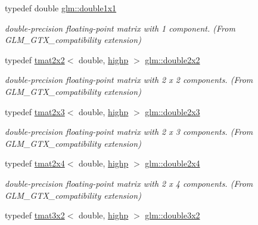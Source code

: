 \begin{DoxyCompactItemize}
typedef double \mbox{\hyperlink{group__gtx__compatibility_ga1c87d3042377335eb050a20ab0ec148a}{glm\+::double1x1}}
\begin{DoxyCompactList}\small\item\em double-\/precision floating-\/point matrix with 1 component. (From G\+L\+M\+\_\+\+G\+T\+X\+\_\+compatibility extension) \end{DoxyCompactList}\item 
typedef \mbox{\hyperlink{structglm_1_1tmat2x2}{tmat2x2}}$<$ double, \mbox{\hyperlink{namespaceglm_a0f04f086094c747d227af4425893f545ac6f7eab42eacbb10d59a58e95e362074}{highp}} $>$ \mbox{\hyperlink{group__gtx__compatibility_ga7651d80f2dcc222a2e229ce44af96f11}{glm\+::double2x2}}
\begin{DoxyCompactList}\small\item\em double-\/precision floating-\/point matrix with 2 x 2 components. (From G\+L\+M\+\_\+\+G\+T\+X\+\_\+compatibility extension) \end{DoxyCompactList}\item 
typedef \mbox{\hyperlink{structglm_1_1tmat2x3}{tmat2x3}}$<$ double, \mbox{\hyperlink{namespaceglm_a0f04f086094c747d227af4425893f545ac6f7eab42eacbb10d59a58e95e362074}{highp}} $>$ \mbox{\hyperlink{group__gtx__compatibility_ga60ae0f5858d498b2e5b9bb8d23019db0}{glm\+::double2x3}}
\begin{DoxyCompactList}\small\item\em double-\/precision floating-\/point matrix with 2 x 3 components. (From G\+L\+M\+\_\+\+G\+T\+X\+\_\+compatibility extension) \end{DoxyCompactList}\item 
typedef \mbox{\hyperlink{structglm_1_1tmat2x4}{tmat2x4}}$<$ double, \mbox{\hyperlink{namespaceglm_a0f04f086094c747d227af4425893f545ac6f7eab42eacbb10d59a58e95e362074}{highp}} $>$ \mbox{\hyperlink{group__gtx__compatibility_gadb90656f5faac0e800718a0a19bf0e03}{glm\+::double2x4}}
\begin{DoxyCompactList}\small\item\em double-\/precision floating-\/point matrix with 2 x 4 components. (From G\+L\+M\+\_\+\+G\+T\+X\+\_\+compatibility extension) \end{DoxyCompactList}\item 
typedef \mbox{\hyperlink{structglm_1_1tmat3x2}{tmat3x2}}$<$ double, \mbox{\hyperlink{namespaceglm_a0f04f086094c747d227af4425893f545ac6f7eab42eacbb10d59a58e95e362074}{highp}} $>$ \mbox{\hyperlink{group__gtx__compatibility_ga00e4b55452fdffa224a68ead4edffa5a}{glm\+::double3x2}}

\end{DoxyCompactItemize}
